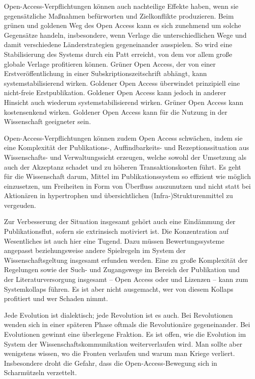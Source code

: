 \documentclass[a4paper,
fontsize=11pt,
oneside,
numbers=noperiodatend,
parskip=half-,
bibliography=totoc,
final
]{scrartcl}
\begin{document}
Open-Access-Verpflichtungen können auch nachteilige Effekte haben, wenn
sie gegensätzliche Maßnahmen befürworten und Zielkonflikte produzieren.
Beim grünen und goldenen Weg des Open Access kann es sich zunehmend um
solche Gegensätze handeln, insbesondere, wenn Verlage die
unterschiedlichen Wege und damit verschiedene Länderstrategien
gegeneinander ausspielen. So wird eine Stabilisierung des Systems durch
ein Patt erreicht, von dem vor allem große globale Verlage profitieren
können. Grüner Open Access, der von einer Erstveröffentlichung in einer
Subskriptionszeitschrift abhängt, kann systemstabilisierend wirken.
Goldener Open Access überwindet prinzipiell eine nicht-freie
Erstpublikation. Goldener Open Access kann jedoch in anderer Hinsicht
auch wiederum systemstabilisierend wirken. Grüner Open Access kann
kostensenkend wirken. Goldener Open Access kann für die Nutzung in der
Wissenschaft geeigneter sein.

Open-Access-Verpflichtungen können zudem Open Access schwächen, indem
sie eine Komplexität der Publikations-, Auffindbarkeits- und
Rezeptionssituation aus Wissenschafts- und Verwaltungssicht erzeugen,
welche sowohl der Umsetzung als auch der Akzeptanz schadet und zu
höheren Transaktionskosten führt. Es geht für die Wissenschaft darum,
Mittel im Publikationssystem so effizient wie möglich einzusetzen, um
Freiheiten in Form von Überfluss auszunutzen und nicht statt bei
Aktionären in hypertrophen und übersichtlichen (Infra-)Strukturenmittel
zu vergeuden.

Zur Verbesserung der Situation insgesamt gehört auch eine Eindämmung der
Publikationsflut, sofern sie extrinsisch motiviert ist. Die
Konzentration auf Wesentliches ist auch hier eine Tugend. Dazu müssen
Bewertungssysteme angepasst beziehungsweise andere Spielregeln im System
der Wissenschaftsgeltung insgesamt erfunden werden. Eine zu große
Komplexität der Regelungen sowie der Such- und Zugangswege im Bereich
der Publikation und der Literaturversorgung insgesamt -- Open Access
oder und Lizenzen -- kann zum Systemkollaps führen. Es ist aber nicht
ausgemacht, wer von diesem Kollaps profitiert und wer Schaden nimmt.

Jede Evolution ist dialektisch; jede Revolution ist es auch. Bei
Revolutionen wenden sich in einer späteren Phase oftmals die
Revolutionäre gegeneinander. Bei Evolutionen gewinnt eine überlegene
Fraktion. Es ist offen, wie die Evolution im System der
Wissenschaftskommunikation weiterverlaufen wird. Man sollte aber
wenigstens wissen, wo die Fronten verlaufen und warum man Kriege
verliert. Insbesondere droht die Gefahr, dass die Open-Access-Bewegung
sich in Scharmützeln verzettelt.
\end{document}
